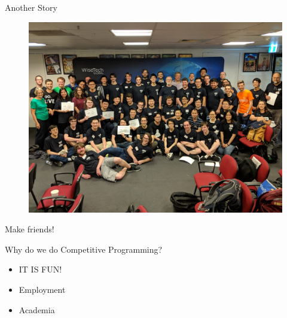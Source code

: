 \begin{frame}{Another Story}
  \begin{figure}
  \centering
  \includegraphics[width=.7\textwidth]{pic/regional-2018.jpg}
  \end{figure}
  Make friends!
\end{frame}

\begin{frame}{Why do we do Competitive Programming?}
  \begin{itemize}
    \item<2-> IT IS FUN!
    \item<3-> Employment
    \item<4-> Academia
  \end{itemize}
\end{frame}
